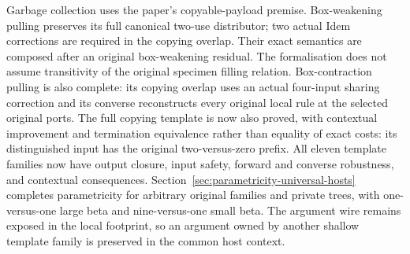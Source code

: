 Garbage collection uses the paper's copyable-payload premise. Box-weakening
pulling preserves its full canonical two-use distributor; two actual Idem
corrections are required in the copying overlap. Their exact semantics are
composed after an original box-weakening residual. The formalisation does not
assume transitivity of the original specimen filling relation. Box-contraction pulling is also complete: its copying overlap uses an actual
four-input sharing correction and its converse reconstructs every original
local rule at the selected original ports. The full copying template is now also proved, with contextual improvement
and termination equivalence rather than equality of exact costs: its
distinguished input has the original two-versus-zero prefix. All eleven template families now have output closure, input safety, forward and converse robustness, and contextual consequences. Section~\ref{sec:parametricity-universal-hosts} completes parametricity for arbitrary original families and private trees, with one-versus-one large beta and nine-versus-one small beta. The argument wire remains exposed in the local footprint, so an argument owned by another shallow template family is preserved in the common host context.

